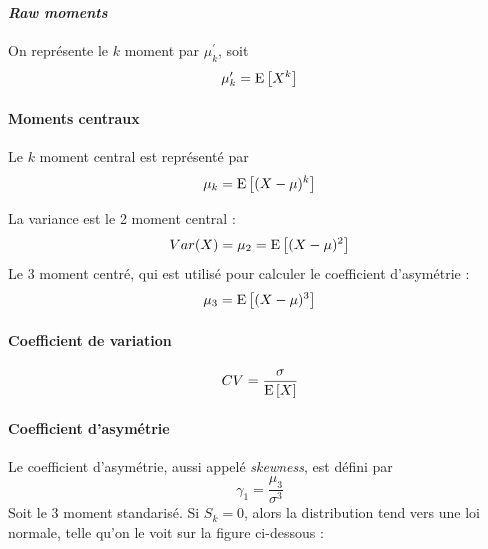 \documentclass[12pt, french]{report}
\begin{document}
\paragraph{\textit{Raw moments}}
On représente le $k$ moment par $\mu_k^\prime$, soit
\begin{equation}
\mu_k^\prime = \mathrm{E} \left[ X^k \right] 
\end{equation}

\paragraph{Moments centraux} Le $k$ moment central est représenté par
\begin{equation}
\mu_k = \mathrm{E} \left[ (X - \mu)^k \right]
\end{equation}

\begin{exemple}
La variance est le 2 moment central : 
\begin{align*}
Var(X) = \mu_2 =  \mathrm{E} \left[ (X - \mu)^2 \right] \\
\end{align*}
Le 3 moment centré, qui est utilisé pour calculer le coefficient d'asymétrie : 
\begin{align*}
\mu_3 = \mathrm{E} \left[ (X-\mu)^3 \right]
\end{align*}
\end{exemple}

\paragraph{Coefficient de variation}
\begin{equation}
CV = \frac{\sigma}{\mathrm{E} \left[ X \right]}
\end{equation}


\paragraph{Coefficient d'asymétrie}
Le coefficient d'asymétrie, aussi appelé \textit{skewness}, est défini par
\begin{equation}
\gamma_1 = \frac{\mu_3}{\sigma^3}
\end{equation}
Soit le 3 moment standarisé. Si $S_k = 0$, alors la distribution tend vers une loi normale, telle qu'on le voit sur la figure ci-dessous : 
\end{document}
